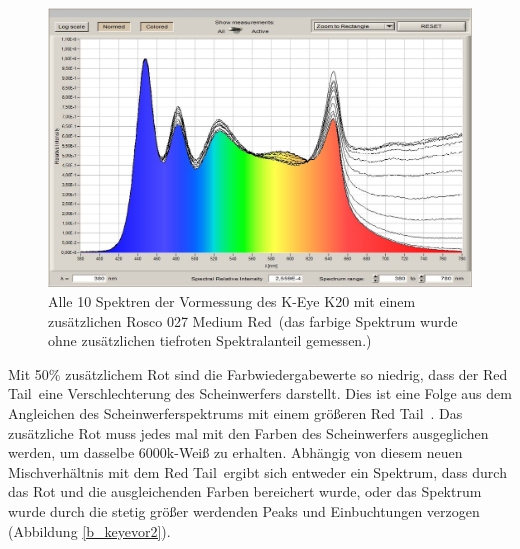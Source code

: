 \begin{figure}[H]     %
\centering
\includegraphics[width=1.0\textwidth]{bilder/keyevor1} 
\caption {Alle 10 Spektren der Vormessung des K-Eye K20 mit einem zusätzlichen  Rosco 027 \glqq Medium Red\grqq\ (das farbige Spektrum wurde ohne zusätzlichen tiefroten Spektralanteil gemessen.)}\label{b_keyevor1}
\end{figure}

Mit 50\% zusätzlichem Rot sind die Farbwiedergabewerte so niedrig, dass der \glqq Red Tail\grqq\ eine Verschlechterung des Scheinwerfers darstellt. Dies ist eine Folge aus dem Angleichen des Scheinwerferspektrums mit einem größeren \glqq Red Tail\grqq\ .
Das zusätzliche Rot muss jedes mal mit den Farben des Scheinwerfers ausgeglichen werden, um dasselbe 6000k-Weiß zu erhalten. Abhängig von diesem neuen Mischverhältnis mit dem \glqq Red Tail\grqq\ ergibt sich entweder ein Spektrum, dass durch das Rot und die ausgleichenden Farben bereichert wurde, oder das Spektrum wurde durch die stetig größer werdenden Peaks und Einbuchtungen verzogen (Abbildung \ref{b_keyevor2}).


